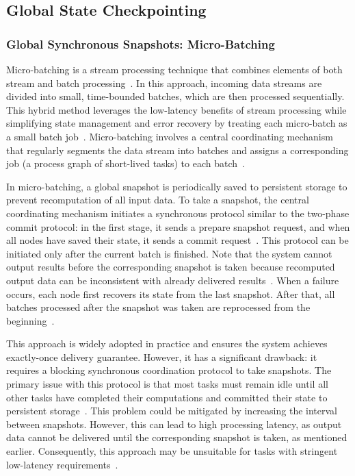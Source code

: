 \subsection{Global State Checkpointing}
\label{phd-related-global-state-checkpointing}

\subsubsection{Global Synchronous Snapshots: Micro-Batching}

Micro-batching is a stream processing technique that combines elements of both stream and batch processing~\cite{Zaharia:2012:DSE:2342763.2342773, zaharia2010spark}. In this approach, incoming data streams are divided into small, time-bounded batches, which are then processed sequentially. This hybrid method leverages the low-latency benefits of stream processing while simplifying state management and error recovery by treating each micro-batch as a small batch job~\cite{garcia2023micro}. Micro-batching involves a central coordinating mechanism that regularly segments the data stream into batches and assigns a corresponding job (a process graph of short-lived tasks) to each batch~\cite{Zaharia:2012:DSE:2342763.2342773}.

In micro-batching, a global snapshot is periodically saved to persistent storage to prevent recomputation of all input data. To take a snapshot, the central coordinating mechanism initiates a synchronous protocol similar to the two-phase commit protocol: in the first stage, it sends a prepare snapshot request, and when all nodes have saved their state, it sends a commit request~\cite{carbone2018scalable}. This protocol can be initiated only after the current batch is finished. Note that the system cannot output results before the corresponding snapshot is taken because recomputed output data can be inconsistent with already delivered results~\cite{carbone2018scalable, thepaper}. When a failure occurs, each node first recovers its state from the last snapshot. After that, all batches processed after the snapshot was taken are reprocessed from the beginning~\cite{Zaharia:2012:DSE:2342763.2342773}.

This approach is widely adopted in practice and ensures the system achieves exactly-once delivery guarantee. However, it has a significant drawback: it requires a blocking synchronous coordination protocol to take snapshots. The primary issue with this protocol is that most tasks must remain idle until all other tasks have completed their computations and committed their state to persistent storage~\cite{carbone2018scalable, thepaper}. This problem could be mitigated by increasing the interval between snapshots. However, this can lead to high processing latency, as output data cannot be delivered until the corresponding snapshot is taken, as mentioned earlier. Consequently, this approach may be unsuitable for tasks with stringent low-latency requirements~\cite{carbone2018scalable}.

